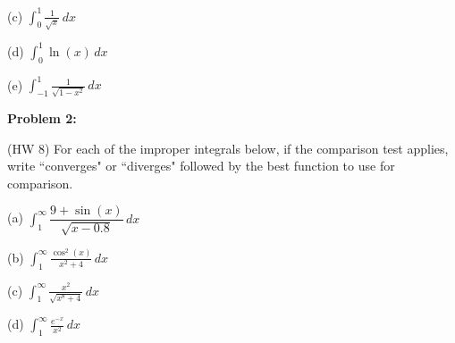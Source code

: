 \documentclass[12pt]{report}
\newcommand{\R}{\mathbb R}
\newcommand{\ds}{\displaystyle}
\begin{document}
\medskip

(c) $\ds \int_0^1 \frac{1}{\sqrt{x}} \, dx$\\

\medskip

(d) $\ds \int_0^1 \ln(x) \, dx$\\

\medskip

(e) $\ds \int_{-1}^{1} \frac{1}{\sqrt{1-x^2}} \, dx$\\

\bigskip\bigskip

\noindent\textbf{Problem 2:} 

\medskip

\noindent (HW 8) For each of the improper integrals below, if the comparison test applies, write ``converges" or ``diverges" followed by the best function to use for comparison.

\medskip

(a) $\ds \int_1^\infty \dfrac{9 + \sin(x)}{\sqrt{x-0.8}} \, dx$\\

\medskip

(b) $\ds \int_1^\infty \frac{\cos^2(x)}{x^2 + 4} \, dx$\\

\medskip

(c) $\ds \int_1^\infty \frac{x^2}{\sqrt{x^8+4}} \, dx$\\

\medskip

(d) $\ds \int_1^\infty \frac{e^{-x}}{x^2} \, dx$\\


%
%
%
%
%
%
\end{document}
